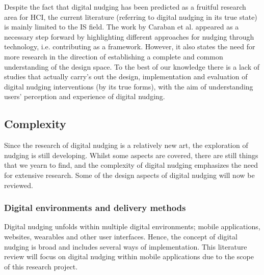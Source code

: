 

Despite the fact that digital nudging has been predicted as a fruitful research area for HCI\cite{mirsch_digital_2017},
the current literature (referring to digital nudging in its true state) is mainly limited to the IS field. The work by Caraban et al. appeared as a necessary step forward by highlighting different approaches for nudging through technology, i.e. contributing as a framework. However, it also states the need for more research in the direction of establishing a complete and common understanding of the design space. To the best of our knowledge there is a lack of studies that actually carry's out the design, implementation and evaluation  of digital nudging interventions (by its true forms), with the aim of understanding users' perception and experience of digital nudging.


\subsection{Complexity}
Since the research of digital nudging is a relatively new art, the exploration of nudging is still developing. Whilst some aspects are covered, there are still things that we yearn to find, and the complexity of digital nudging emphasizes the need for extensive research. Some of the design aspects of digital nudging will now be reviewed.

\subsubsection{Digital environments and delivery methods}
Digital nudging unfolds within multiple digital environments; mobile applications, websites, wearables and other user interfaces\cite{mirsch_digital_2017}.
Hence, the concept of digital nudging is broad and includes several ways of implementation. This literature review will focus on digital nudging within mobile applications due to the scope of this research project. 

